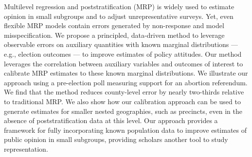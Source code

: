 Multilevel regression and poststratification (MRP) is widely used to estimate opinion in small subgroups and to adjust unrepresentative surveys.
Yet, even flexible MRP models contain errors generated by non-response and model misspecification.
We propose a principled, data-driven method to leverage observable errors on auxiliary quantities with known marginal distributions --- e.g., election outcomes --- to improve estimates of policy attitudes. 
Our method leverages the correlation between auxiliary variables and outcomes of interest to calibrate MRP estimates to these known marginal distributions.
We illustrate our approach using a pre-election poll measuring support for an abortion referendum. 
We find that the method reduces county-level error by nearly two-thirds relative to traditional MRP.
We also show how our calibration approach can be used to generate estimates for smaller nested geographies, such as precincts, even in the absence of poststratification data at this level.
Our approach provides a framework for fully incorporating known population data to improve estimates of public opinion in small subgroups, providing scholars another tool to study representation.